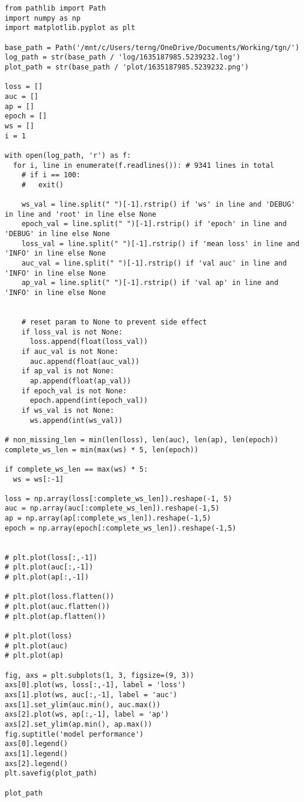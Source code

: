 \documentclass[11pt]{article}
\begin{document}
\begin{verbatim}
from pathlib import Path
import numpy as np
import matplotlib.pyplot as plt

base_path = Path('/mnt/c/Users/terng/OneDrive/Documents/Working/tgn/')
log_path = str(base_path / 'log/1635187985.5239232.log')
plot_path = str(base_path / 'plot/1635187985.5239232.png')

loss = []
auc = []
ap = []
epoch = []
ws = []
i = 1

with open(log_path, 'r') as f:
  for i, line in enumerate(f.readlines()): # 9341 lines in total
    # if i == 100:
    #   exit()

    ws_val = line.split(" ")[-1].rstrip() if 'ws' in line and 'DEBUG' in line and 'root' in line else None
    epoch_val = line.split(" ")[-1].rstrip() if 'epoch' in line and 'DEBUG' in line else None
    loss_val = line.split(" ")[-1].rstrip() if 'mean loss' in line and 'INFO' in line else None
    auc_val = line.split(" ")[-1].rstrip() if 'val auc' in line and 'INFO' in line else None
    ap_val = line.split(" ")[-1].rstrip() if 'val ap' in line and 'INFO' in line else None


    # reset param to None to prevent side effect
    if loss_val is not None:
      loss.append(float(loss_val))
    if auc_val is not None:
      auc.append(float(auc_val))
    if ap_val is not None:
      ap.append(float(ap_val))
    if epoch_val is not None:
      epoch.append(int(epoch_val))
    if ws_val is not None:
      ws.append(int(ws_val))

# non_missing_len = min(len(loss), len(auc), len(ap), len(epoch))
complete_ws_len = min(max(ws) * 5, len(epoch))

if complete_ws_len == max(ws) * 5:
  ws = ws[:-1]

loss = np.array(loss[:complete_ws_len]).reshape(-1, 5)
auc = np.array(auc[:complete_ws_len]).reshape(-1,5)
ap = np.array(ap[:complete_ws_len]).reshape(-1,5)
epoch = np.array(epoch[:complete_ws_len]).reshape(-1,5)


# plt.plot(loss[:,-1])
# plt.plot(auc[:,-1])
# plt.plot(ap[:,-1])

# plt.plot(loss.flatten())
# plt.plot(auc.flatten())
# plt.plot(ap.flatten())

# plt.plot(loss)
# plt.plot(auc)
# plt.plot(ap)

fig, axs = plt.subplots(1, 3, figsize=(9, 3))
axs[0].plot(ws, loss[:,-1], label = 'loss')
axs[1].plot(ws, auc[:,-1], label = 'auc')
axs[1].set_ylim(auc.min(), auc.max())
axs[2].plot(ws, ap[:,-1], label = 'ap')
axs[2].set_ylim(ap.min(), ap.max())
fig.suptitle('model performance')
axs[0].legend()
axs[1].legend()
axs[2].legend()
plt.savefig(plot_path)

plot_path
\end{verbatim}
\end{document}
